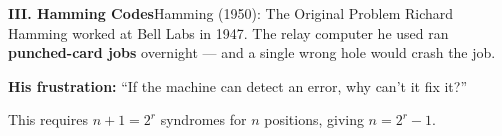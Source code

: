 \begin{frame}{\textbf{III. Hamming Codes}}{Hamming (1950): The Original Problem}
\small
Richard Hamming worked at Bell Labs in 1947. The relay computer he used ran \textbf{punched-card jobs} overnight — and a single wrong hole would crash the job.

\medskip
\textbf{His frustration:} ``If the machine can detect an error, why can't it fix it?''

\medskip
{}

\medskip
This requires $n + 1 = 2^r$ syndromes for $n$ positions, giving $n = 2^r - 1$.
%
%
%
%
\end{frame}

